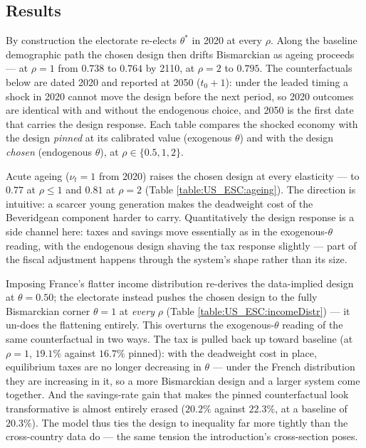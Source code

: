 \subsection{Results}
By construction the electorate re-elects $\theta^{\ast}$ in 2020 at every $\rho$. Along the baseline demographic path the chosen design then drifts Bismarckian as ageing proceeds --- at $\rho = 1$ from $0.738$ to $0.764$ by 2110, at $\rho = 2$ to $0.795$. The counterfactuals below are dated 2020 and reported at 2050 ($t_0+1$): under the leaded timing a shock in 2020 cannot move the design before the next period, so 2020 outcomes are identical with and without the endogenous choice, and 2050 is the first date that carries the design response. Each table compares the shocked economy with the design \emph{pinned} at its calibrated value (exogenous $\theta$) and with the design \emph{chosen} (endogenous $\theta$), at $\rho \in \{0.5, 1, 2\}$.

 Acute ageing ($\nu_t = 1$ from 2020) raises the chosen design at every elasticity --- to $0.77$ at $\rho \leq 1$ and $0.81$ at $\rho = 2$ (Table \ref{table:US_ESC:ageing}). The direction is intuitive: a scarcer young generation makes the deadweight cost of the Beveridgean component harder to carry. Quantitatively the design response is a side channel here: taxes and savings move essentially as in the exogenous-$\theta$ reading, with the endogenous design shaving the tax response slightly --- part of the fiscal adjustment happens through the system's shape rather than its size.



 Imposing France's flatter income distribution re-derives the data-implied design at $\theta = 0.50$; the electorate instead pushes the chosen design to the fully Bismarckian corner $\theta = 1$ at \emph{every} $\rho$ (Table \ref{table:US_ESC:incomeDistr}) --- it un-does the flattening entirely. This overturns the exogenous-$\theta$ reading of the same counterfactual in two ways. The tax is pulled back up toward baseline (at $\rho = 1$, $19.1\%$ against $16.7\%$ pinned): with the deadweight cost in place, equilibrium taxes are no longer decreasing in $\theta$ --- under the French distribution they are increasing in it, so a more Bismarckian design and a larger system come together. And the savings-rate gain that makes the pinned counterfactual look transformative is almost entirely erased ($20.2\%$ against $22.3\%$, at a baseline of $20.3\%$). The model thus ties the design to inequality far more tightly than the cross-country data do --- the same tension the introduction's cross-section poses.

